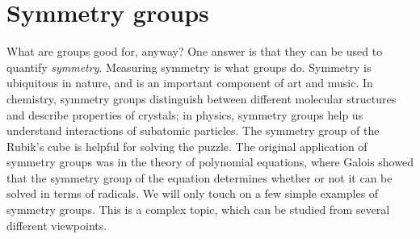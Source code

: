 \documentclass[11pt]{article}
\theoremstyle{definition}
\begin{document}
\setcounter{section}{8}



\section{Symmetry groups}\noindent
What are groups good for, anyway? One answer is that they can be used
to quantify \emph{symmetry}.  Measuring symmetry is what groups
do. Symmetry is ubiquitous in nature, and is an important component of
art and music. In chemistry, symmetry groups distinguish between
different molecular structures and describe properties of crystals; in
physics, symmetry groups help us understand interactions of subatomic
particles. The symmetry group of the Rubik's cube is helpful for
solving the puzzle. The original application of symmetry groups was in
the theory of polynomial equations, where Galois showed that the
symmetry group of the equation determines whether or not it can be
solved in terms of radicals. We will only touch on a few simple
examples of symmetry groups. This is a complex topic, which can be
studied from several different viewpoints.
\end{document}
